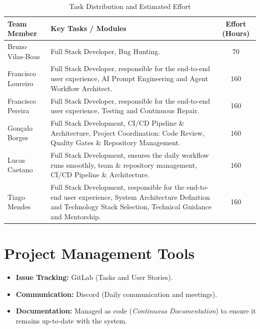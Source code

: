 \documentclass[a4paper,12pt]{report}
\begin{document}
\begin{table}[h]
    \centering
    \caption{Task Distribution and Estimated Effort}
    \label{tab:effort_distribution}
    \renewcommand{\arraystretch}{1.5}
    \begin{tabular}{|l|p{8.5cm}|c|}
        \hline
        \textbf{Team Member} & \textbf{Key Tasks / Modules} & \textbf{Effort (Hours)} \\ \hline

        Bruno Vilas-Boas & 
        Full Stack Developer, Bug Hunting. & 70 \\ \hline

        Francisco Loureiro & 
        Full Stack Developer, responsible for the end-to-end user experience, AI Prompt Engineering and Agent Workflow Architect. & 160 \\ \hline

        Francisco Pereira & 
        Full Stack Developer, responsible for the end-to-end user experience, Testing and Continuous Repair. & 160 \\ \hline
        
        Gonçalo Borges & 
        Full Stack Development, CI/CD Pipeline \& Architecture, Project Coordination: Code Review, Quality Gates \& Repository Management. & 160 \\ \hline

        Lucas Caetano & 
        Full Stack Development, ensures the daily workflow runs smoothly, team \& repository management, CI/CD Pipeline \& Architecture. & 160 \\ \hline
        
        Tiago Mendes & 
        Full Stack Development, responsible for the end-to-end user experience, System Architecture Definition and Technology Stack Selection, Technical Guidance and Mentorship. & 160 \\ \hline
        
        
    \end{tabular}
\end{table}

\section{Project Management Tools}
\begin{itemize}
    \item \textbf{Issue Tracking:} GitLab (Tasks and User Stories).
    \item \textbf{Communication:} Discord (Daily communication and meetings).
    \item \textbf{Documentation:} Managed as code (\textit{Continuous Documentation}) to ensure it remains up-to-date with the system.
\end{itemize}
\end{document}
